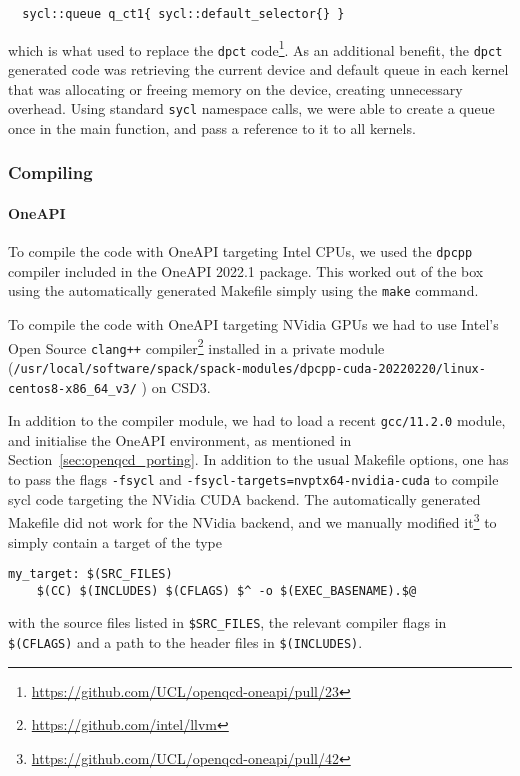 \documentclass[../main]{subfiles}
\begin{document}
\begin{verbatim}
  sycl::queue q_ct1{ sycl::default_selector{} }
\end{verbatim}

which is what used to replace the \texttt{dpct} code\footnote{\url{https://github.com/UCL/openqcd-oneapi/pull/23}}.
As an additional benefit, the \texttt{dpct} generated code was retrieving the current device and default queue in each kernel that was allocating or freeing memory on the device, creating unnecessary overhead.
Using standard \texttt{sycl} namespace calls, we were able to create a queue once in the main function, and pass a reference to it to all kernels.

\subsubsection{Compiling}\label{sec:openqcd_compiling}

\paragraph{OneAPI}

To compile the code with OneAPI targeting Intel CPUs, we used the \texttt{dpcpp} compiler included in the OneAPI 2022.1 package.
This worked out of the box using the automatically generated Makefile simply using the \texttt{make} command.

To compile the code with OneAPI targeting NVidia GPUs we had to use Intel's Open Source \verb #clang++# compiler\footnote{\url{https://github.com/intel/llvm}} installed in a private module (\verb #/usr/local/software/spack/spack-modules/dpcpp-cuda-20220220/linux-centos8-x86_64_v3/# ) on CSD3.

In addition to the compiler module, we had to load a recent \verb #gcc/11.2.0# module, and initialise the OneAPI environment, as mentioned in Section~\ref{sec:openqcd_porting}.
In addition to the usual Makefile options, one has to pass the flags \verb #-fsycl# and \verb #-fsycl-targets=nvptx64-nvidia-cuda# to compile sycl code targeting the NVidia CUDA backend.
The automatically generated Makefile did not work for the NVidia backend, and we manually modified it\footnote{\url{https://github.com/UCL/openqcd-oneapi/pull/42}} to simply contain a target of the type
\begin{verbatim}
my_target: $(SRC_FILES)
	$(CC) $(INCLUDES) $(CFLAGS) $^ -o $(EXEC_BASENAME).$@
\end{verbatim}
with the source files listed in \verb #$SRC_FILES#, the relevant compiler flags in \verb #$(CFLAGS)# and a path to the header files in \verb #$(INCLUDES)#.
\end{document}
